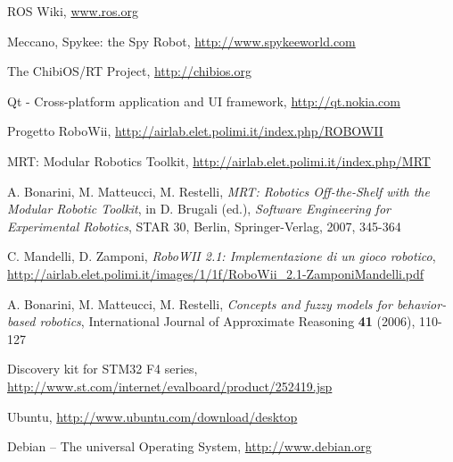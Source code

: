 \begin{thebibliography}{9}

  ROS Wiki, \url{www.ros.org}

  Meccano, Spykee: the Spy Robot, \url{http://www.spykeeworld.com}

  The ChibiOS/RT Project, \url{http://chibios.org}

	Qt - Cross-platform application and UI framework, \url{http://qt.nokia.com}

  Progetto RoboWii, \url{http://airlab.elet.polimi.it/index.php/ROBOWII}

  MRT: Modular Robotics Toolkit, \url{http://airlab.elet.polimi.it/index.php/MRT}

  A. Bonarini, M. Matteucci, M. Restelli, \emph{MRT: Robotics Off-the-Shelf with the Modular Robotic Toolkit},
  in D. Brugali (ed.), \emph{Software Engineering for Experimental Robotics}, STAR 30, Berlin, Springer-Verlag, 2007, 345-364

  C. Mandelli, D. Zamponi, \emph{RoboWII 2.1: Implementazione di un gioco robotico}, \url{http://airlab.elet.polimi.it/images/1/1f/RoboWii_2.1-ZamponiMandelli.pdf}

  A. Bonarini, M. Matteucci, M. Restelli, \emph{Concepts and fuzzy models for behavior-based robotics}, International Journal of Approximate Reasoning \textbf{41} (2006), 110-127

  Discovery kit for STM32 F4 series, \url{http://www.st.com/internet/evalboard/product/252419.jsp}

  Ubuntu, \url{http://www.ubuntu.com/download/desktop}

  Debian -- The universal Operating System, \url{http://www.debian.org}

\end{thebibliography}
